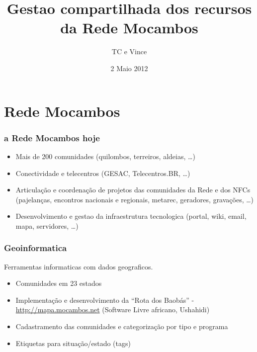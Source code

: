 \documentclass{beamer}
\title{Gestao compartilhada dos recursos da Rede Mocambos}
\author{TC e Vince}
\institute{Casa de Cultura Tain\~{a} - Rede Mocambos}
\date{2 Maio 2012}
\begin{document}
{
%
\begin{frame}
  \titlepage
\end{frame}


\section{Rede Mocambos}


\begin{frame}
  \frametitle{a Rede Mocambos hoje}

  \begin{itemize}
    \item Mais de 200 comunidades (quilombos, terreiros, aldeias, \ldots)
    \item Conectividade e telecentros (GESAC, Telecentros.BR, \ldots)
    \item Articulação e coordenação de projetos das comunidades da
      Rede e dos NFCs (pajelanças, encontros nacionais e regionais, metarec,
      geradores, gravações, \ldots)
    \item Desenvolvimento e gestao da infraestrutura tecnologica
      (portal, wiki, email, mapa, servidores, \ldots)  
    \end{itemize}
\end{frame}

\begin{frame}
  \frametitle{Geoinformatica}
  Ferramentas informaticas com dados geograficos.
  \begin{itemize}
    \item Comunidades em 23 estados
    \item Implementação e desenvolvimento da ``Rota dos Baobás'' -
      \url{http://mapa.mocambos.net} (Software Livre africano, Ushahidi)
    \item Cadastramento das comunidades e categorização por tipo e programa
    \item Etiquetas para situação/estado (tags)
    \end{itemize}
\end{frame}

}
\end{document}

